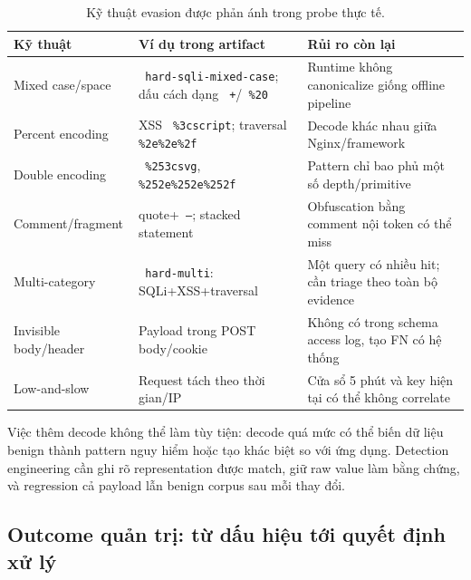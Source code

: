 \documentclass[runningheads]{report-template/llncs}
\newcommand{\code}[1]{\texttt{\small\hyphenchar\font=45 #1}}
\begin{document}
\begin{table}
\caption{Kỹ thuật evasion được phản ánh trong probe thực tế.}
\label{tab:evasion}
\centering\small
\begin{tabularx}{\textwidth}{@{}p{27mm}p{40mm}Y@{}}
\toprule
Kỹ thuật & Ví dụ trong artifact & Rủi ro còn lại\\
\midrule
Mixed case/space & \code{hard-sqli-mixed-case}; dấu cách dạng
\code{+}/\code{\%20} & Runtime không canonicalize giống offline pipeline\\
Percent encoding & XSS \code{\%3cscript}; traversal
\code{\%2e\%2e\%2f} & Decode khác nhau giữa Nginx/framework\\
Double encoding & \code{\%253csvg}, \code{\%252e\%252e\%252f} & Pattern
chỉ bao phủ một số depth/primitive\\
Comment/fragment & quote+\code{--}; stacked statement & Obfuscation bằng
comment nội token có thể miss\\
Multi-category & \code{hard-multi}: SQLi+XSS+traversal & Một query có
nhiều hit; cần triage theo toàn bộ evidence\\
Invisible body/header & Payload trong POST body/cookie & Không có trong
schema access log, tạo FN có hệ thống\\
Low-and-slow & Request tách theo thời gian/IP & Cửa sổ 5 phút và key hiện
tại có thể không correlate\\
\bottomrule
\end{tabularx}
\end{table}

Việc thêm decode không thể làm tùy tiện: decode quá mức có thể biến dữ
liệu benign thành pattern nguy hiểm hoặc tạo khác biệt so với ứng dụng.
Detection engineering cần ghi rõ representation được match, giữ raw value
làm bằng chứng, và regression cả payload lẫn benign corpus sau mỗi thay
đổi.

\subsection{Outcome quản trị: từ dấu hiệu tới quyết định xử lý}
\end{document}
